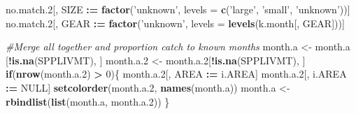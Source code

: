 \documentclass[]{article}
\newenvironment{Shaded}{\begin{snugshade}}{\end{snugshade}}
\newcommand{\KeywordTok}[1]{\textcolor[rgb]{0.13,0.29,0.53}{\textbf{#1}}}
\newcommand{\DataTypeTok}[1]{\textcolor[rgb]{0.13,0.29,0.53}{#1}}
\newcommand{\DecValTok}[1]{\textcolor[rgb]{0.00,0.00,0.81}{#1}}
\newcommand{\StringTok}[1]{\textcolor[rgb]{0.31,0.60,0.02}{#1}}
\newcommand{\CommentTok}[1]{\textcolor[rgb]{0.56,0.35,0.01}{\textit{#1}}}
\newcommand{\OtherTok}[1]{\textcolor[rgb]{0.56,0.35,0.01}{#1}}
\newcommand{\ControlFlowTok}[1]{\textcolor[rgb]{0.13,0.29,0.53}{\textbf{#1}}}
\newcommand{\OperatorTok}[1]{\textcolor[rgb]{0.81,0.36,0.00}{\textbf{#1}}}
\newcommand{\ErrorTok}[1]{\textcolor[rgb]{0.64,0.00,0.00}{\textbf{#1}}}
\newcommand{\NormalTok}[1]{#1}
\begin{document}
\begin{Shaded}
\begin{Highlighting}[]
\NormalTok{  no.match.}\DecValTok{2}\NormalTok{[, SIZE }\OperatorTok{:}\ErrorTok{=}\StringTok{ }\KeywordTok{factor}\NormalTok{(}\StringTok{'unknown'}\NormalTok{, }\DataTypeTok{levels =} \KeywordTok{c}\NormalTok{(}\StringTok{'large'}\NormalTok{, }\StringTok{'small'}\NormalTok{, }\StringTok{'unknown'}\NormalTok{))]}
\NormalTok{  no.match.}\DecValTok{2}\NormalTok{[, GEAR }\OperatorTok{:}\ErrorTok{=}\StringTok{ }\KeywordTok{factor}\NormalTok{(}\StringTok{'unknown'}\NormalTok{, }\DataTypeTok{levels =} \KeywordTok{levels}\NormalTok{(k.month[, GEAR]))]}
  
  \CommentTok{#Merge all together and proportion catch to known months}
\NormalTok{  month.a   <-}\StringTok{ }\NormalTok{month.a  [}\OperatorTok{!}\KeywordTok{is.na}\NormalTok{(SPPLIVMT), ]}
\NormalTok{  month.a.}\DecValTok{2}\NormalTok{ <-}\StringTok{ }\NormalTok{month.a.}\DecValTok{2}\NormalTok{[}\OperatorTok{!}\KeywordTok{is.na}\NormalTok{(SPPLIVMT), ]}
  \ControlFlowTok{if}\NormalTok{(}\KeywordTok{nrow}\NormalTok{(month.a.}\DecValTok{2}\NormalTok{) }\OperatorTok{>}\StringTok{ }\DecValTok{0}\NormalTok{)\{}
\NormalTok{    month.a.}\DecValTok{2}\NormalTok{[, AREA   }\OperatorTok{:}\ErrorTok{=}\StringTok{ }\NormalTok{i.AREA]}
\NormalTok{    month.a.}\DecValTok{2}\NormalTok{[, i.AREA }\OperatorTok{:}\ErrorTok{=}\StringTok{ }\OtherTok{NULL}\NormalTok{]}
    \KeywordTok{setcolorder}\NormalTok{(month.a.}\DecValTok{2}\NormalTok{, }\KeywordTok{names}\NormalTok{(month.a))}
\NormalTok{    month.a <-}\StringTok{ }\KeywordTok{rbindlist}\NormalTok{(}\KeywordTok{list}\NormalTok{(month.a, month.a.}\DecValTok{2}\NormalTok{))}
\NormalTok{    \}}
  

\end{Highlighting}
\end{Shaded}
\end{document}
